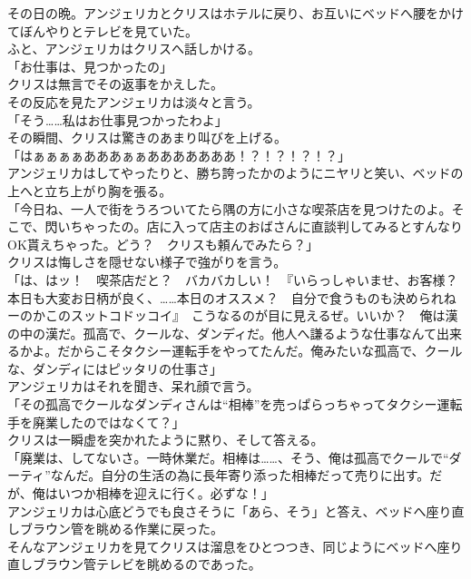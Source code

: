 \documentclass[b5j,10pt,openany]{jsbook}
\begin{document}
その日の晩。アンジェリカとクリスはホテルに戻り、お互いにベッドへ腰をかけてぼんやりとテレビを見ていた。\\ふと、アンジェリカはクリスへ話しかける。\\「お仕事は、見つかったの」\\クリスは無言でその返事をかえした。\\その反応を見たアンジェリカは淡々と言う。\\「そう\ldots{}\ldots{}私はお仕事見つかったわよ」\\その瞬間、クリスは驚きのあまり叫びを上げる。\\「はぁぁぁぁあああぁぁあああああああ！？！？！？！？」\\アンジェリカはしてやったりと、勝ち誇ったかのようにニヤリと笑い、ベッドの上へと立ち上がり胸を張る。\\「今日ね、一人で街をうろついてたら隅の方に小さな喫茶店を見つけたのよ。そこで、閃いちゃったの。店に入って店主のおばさんに直談判してみるとすんなりOK貰えちゃった。どう？　クリスも頼んでみたら？」\\クリスは悔しさを隠せない様子で強がりを言う。\\「は、はッ！　喫茶店だと？　バカバカしい！　『いらっしゃいませ、お客様？　本日も大変お日柄が良く、\ldots{}\ldots{}本日のオススメ？　自分で食うものも決められねーのかこのスットコドッコイ』　こうなるのが目に見えるぜ。いいか？　俺は漢の中の漢だ。孤高で、クールな、ダンディだ。他人へ謙るような仕事なんて出来るかよ。だからこそタクシー運転手をやってたんだ。俺みたいな孤高で、クールな、ダンディにはピッタリの仕事さ」\\アンジェリカはそれを聞き、呆れ顔で言う。\\「その孤高でクールなダンディさんは``相棒''を売っぱらっちゃってタクシー運転手を廃業したのではなくて？」\\クリスは一瞬虚を突かれたように黙り、そして答える。\\「廃業は、してないさ。一時休業だ。相棒は\ldots{}\ldots{}、そう、俺は孤高でクールで``ダーティ''なんだ。自分の生活の為に長年寄り添った相棒だって売りに出す。だが、俺はいつか相棒を迎えに行く。必ずな！」\\アンジェリカは心底どうでも良さそうに「あら、そう」と答え、ベッドへ座り直しブラウン管を眺める作業に戻った。\\そんなアンジェリカを見てクリスは溜息をひとつつき、同じようにベッドへ座り直しブラウン管テレビを眺めるのであった。
\end{document}

